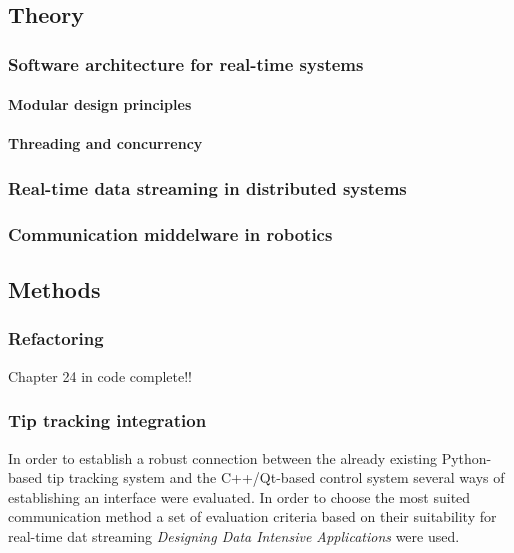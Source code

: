 

\subsection{Theory}
\subsubsection{Software architecture for real-time systems}
\paragraph*{Modular design principles}
\paragraph*{Threading and concurrency}

\subsubsection{Real-time data streaming in distributed systems}

\subsubsection{Communication middelware in robotics}

\subsection{Methods}
\subsubsection{Refactoring}
Chapter 24 in code complete!!

\subsubsection{Tip tracking integration}
In order to establish a robust connection between the already existing Python-based tip tracking system and the C++/Qt-based control system several ways of establishing an interface were evaluated. In order to choose the most suited communication method a set of evaluation criteria based on their suitability for real-time dat streaming \textit{Designing Data Intensive Applications} \cite{kleppmann_designing_2017} were used.

